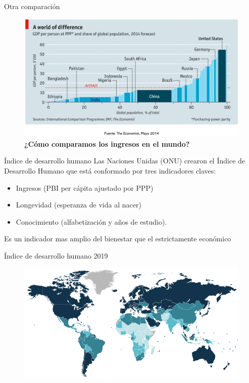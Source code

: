 \documentclass{beamer}
\begin{document}
\begin{frame}{Otra comparación}
    \begin{figure} [H]   \includegraphics[scale=0.4]{Figures/C16.6.png}
\caption{\textbf{¿Cómo comparamos los ingresos en el mundo?}}
\label{fig:16.6}
\end{figure}

\end{frame}


\begin{frame}{Índice de desarrollo humano}
    Las Naciones Unidas (ONU) crearon el Índice de Desarrollo Humano que está conformado por tres indicadores claves: \vspace{1mm}
\begin{itemize}
    \item Ingresos (PBI per cápita ajustado por PPP) \vspace{1mm}
    \item Longevidad (esperanza de vida al nacer) \vspace{1mm}
    \item Conocimiento (alfabetización y años de estudio).
\end{itemize} \vspace{2mm}
    Es un indicador mas amplio del bienestar que el estrictamente económico

\end{frame}


\begin{frame}{Índice de desarrollo humano 2019}
\begin{figure} [H]  \includegraphics[scale=0.4]{Figures/C16.7.png}
\end{figure}
\end{frame}
\end{document}
